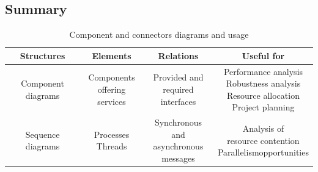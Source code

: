 \documentclass[12pt, a4paper]{report}
\begin{document}
            \subsection{Summary}
            \begin{table}[H]
                \centering
                \begin{tabular}{c|ccc}
                \hline
                \textbf{Structures}    & \textbf{Elements}                              & \textbf{Relations}                                                    & \textbf{Useful for}                                                                           \\ \hline
                Component diagrams     & \makecell{Components\\offering services}       & \makecell{Provided and\\required interfaces}                          & \makecell{Performance analysis\\Robustness analysis\\Resource allocation\\Project planning}   \\ \hline
                Sequence diagrams      & \makecell{Processes\\Threads}                  & \makecell{Synchronous and\\asynchronous\\messages}                     & \makecell{Analysis of\\resource contention\\Parallelismopportunities}                         \\ \hline
                \end{tabular}
                \caption{Component and connectors diagrams and usage}
                \label{tab:my-table0}
            \end{table}
\end{document}
